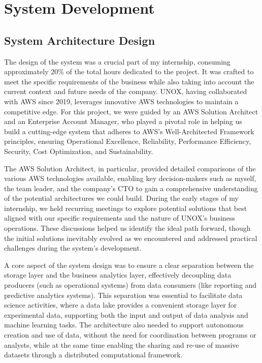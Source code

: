 \chapter{System Development}
\label{chp:project}

\section{System Architecture Design}
The design of the system was a crucial part of my internship, consuming approximately 20\% of the total hours dedicated to the project. It was crafted to meet the specific requirements of the business while also taking into account the current context and future needs of the company. UNOX, having collaborated with \ac{AWS} since 2019, leverages innovative \ac{AWS} technologies to maintain a competitive edge. For this project, we were guided by an \ac{AWS} Solution Architect and an Enterprise Account Manager, who played a pivotal role in helping us build a cutting-edge system that adheres to \ac{AWS}'s Well-Architected Framework principles, ensuring Operational Excellence, Reliability, Performance Efficiency, Security, Cost Optimization, and Sustainability.

The \ac{AWS} Solution Architect, in particular, provided detailed comparisons of the various \ac{AWS} technologies available, enabling key decision-makers such as myself, the team leader, and the company's CTO to gain a comprehensive understanding of the potential architectures we could build. During the early stages of my internship, we held recurring meetings to explore potential solutions that best aligned with our specific requirements and the nature of UNOX's business operations. These discussions helped us identify the ideal path forward, though the initial solutions inevitably evolved as we encountered and addressed practical challenges during the system's development.

A core aspect of the system design was to ensure a clear separation between the storage layer and the business analytics layer, effectively decoupling data producers (such as operational systems) from data consumers (like reporting and predictive analytics systems). This separation was essential to facilitate data science activities, where a data lake provides a convenient storage layer for experimental data, supporting both the input and output of data analysis and machine learning tasks. The architecture also needed to support autonomous creation and use of data, without the need for coordination between programs or analysts, while at the same time enabling the sharing and re-use of massive datasets through a distributed computational framework.

